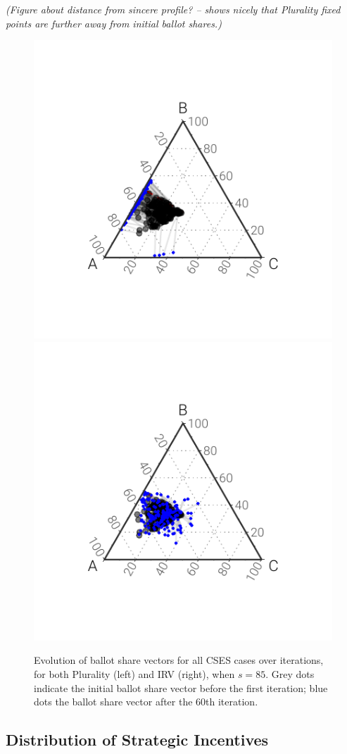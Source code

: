 \documentclass[12pt, letter]{article}
\begin{document}
\emph{(Figure about distance from sincere profile? -- shows nicely that Plurality fixed points are further away from initial ballot shares.)
}
\begin{figure}[]
	\centering
	\includegraphics[width = .49\textwidth]{../output/figures/tatonnement_plur}
	\includegraphics[width = .49\textwidth]{../output/figures/tatonnement_rcv}
	\caption{Evolution of ballot share vectors for all CSES cases over iterations, for both Plurality (left) and IRV (right), when $s = 85$. Grey dots indicate the initial ballot share vector before the first iteration; blue dots the ballot share vector after the 60th iteration.}
	\label{fig:convergence_paths}
\end{figure}

\subsection{Distribution of Strategic Incentives}

\end{document}
